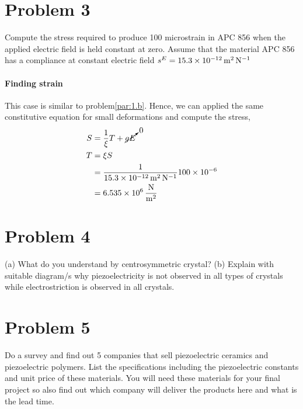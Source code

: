 \documentclass[../main.tex]{subfiles}
\begin{document}
\section{Problem 3}

Compute the stress required to produce 100 microstrain in APC 856 when the applied electric field is held constant at zero. 
Assume that the material APC 856 has a compliance at constant electric field $s^E=\SI{15.3d-12}{\meter\squared\per\newton}$

\paragraph{Finding strain} This case is similar to problem\ref{par:1.b}.
Hence, we can applied the same constitutive equation for small deformations and compute the stress,
\begin{align*}
    S &= \frac{1}{\xi}T + \cancelto{0}{g E} \\
    T &= \xi S \\
      &= \frac{1}{\SI{15.3d-12}{\meter\squared\per\newton}}\num{100d-6} \\
      &= \SI[per-mode=fraction]{6.535d6}{\newton\per\meter\squared}
\end{align*}


\section{Problem 4}

(a) What do you understand by centrosymmetric crystal? 
(b) Explain with suitable diagram/s why piezoelectricity is not observed in all types of crystals while electrostriction is observed in all crystals.

\section{Problem 5}

Do a survey and find out 5 companies that sell piezoelectric ceramics and piezoelectric polymers. List the specifications including the piezoelectric constants and unit price of these materials. You will need these materials for your final project so also find out which company will deliver the products here and what is the lead time.
\end{document}
